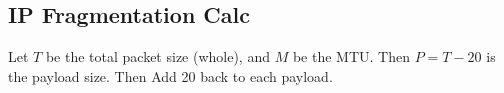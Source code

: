 \subsection{IP Fragmentation Calc}
Let $T$ be the total packet size (whole), and $M$ be the MTU. Then
$P=T-20$ is the payload size. Then
Add 20 back to each payload.